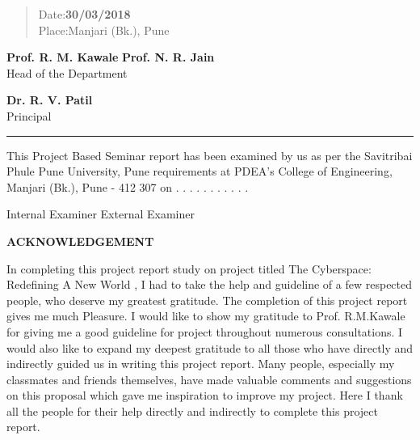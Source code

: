 \documentclass[11pt,a4paper]{article}
\begin{document}
\begin{quote}
Date:\textbf{30/03/2018}\\
Place:Manjari (Bk.), Pune
\end{quote}

\vspace{0.2 in}

\begin{center}
\textbf{Prof. R. M. Kawale} \hspace{150pt} \textbf{Prof. N. R. Jain}\\
\hspace{62pt}{Guide} \hspace{165pt} Head of the Department
\end{center}

\begin{center}\textbf{Dr. R. V. Patil}\\ 
{Principal}
\end{center}

\par\noindent\rule{\textwidth}{0.4pt}
This Project Based Seminar report has been examined by us as per the Savitribai Phule Pune University, Pune requirements at PDEA's College of Engineering, Manjari (Bk.), Pune - 412 307  on . . . . . . . . . . .
\\
\begin{center}
Internal Examiner  \hspace{200pt}External Examiner
\end{center}

\newpage
\pagestyle{empty}           

\begin{center}\textbf{\Large{ACKNOWLEDGEMENT}}
\end{center}
In completing this project report study on project titled The Cyberspace: Redefining A New World , I had to 
take the help and guideline of a few respected people, who deserve my greatest gratitude. 
The completion of this project report gives me much Pleasure. I would like to show 
my gratitude to Prof. R.M.Kawale for giving me a good guideline for project throughout 
numerous consultations. I would also like to expand my deepest gratitude to all those who
have directly and indirectly guided us in writing this project report. 
Many people, especially my classmates and friends themselves, have made valuable 
comments and suggestions on this proposal which gave me inspiration to improve my project. 
Here I thank all the people for their help directly and indirectly to complete this project
report.
\end{document}
